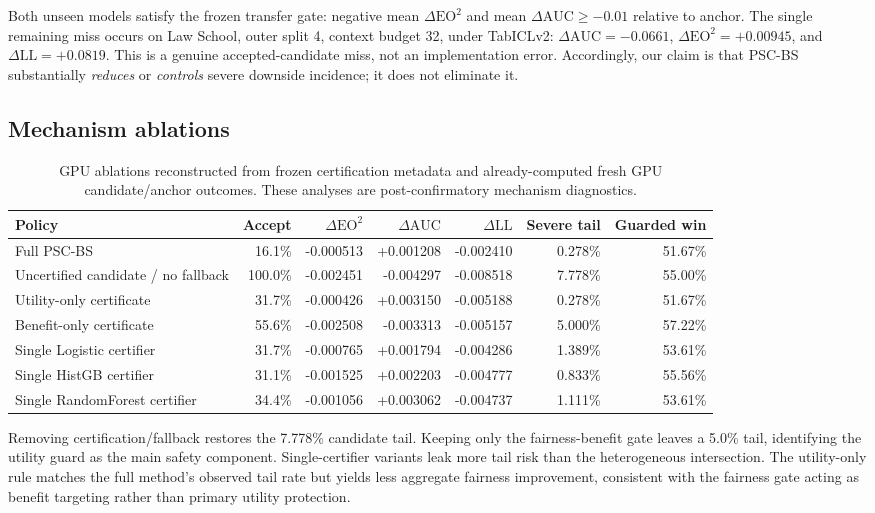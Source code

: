 \documentclass[10pt]{article}
\newcommand{\PSC}{\textsc{PSC-BS}}
\newcommand{\eo}{\mathrm{EO}^2}
\newcommand{\AUC}{\mathrm{AUC}}
\newcommand{\LL}{\mathrm{LL}}
\begin{document}
Both unseen models satisfy the frozen transfer gate: negative mean $\Delta\eo$ and mean $\Delta\AUC\ge-0.01$ relative to anchor.
The single remaining miss occurs on Law School, outer split 4, context budget 32, under TabICLv2: $\Delta\AUC=-0.0661$, $\Delta\eo=+0.00945$, and $\Delta\LL=+0.0819$.
This is a genuine accepted-candidate miss, not an implementation error.
Accordingly, our claim is that \PSC{} substantially \emph{reduces} or \emph{controls} severe downside incidence; it does not eliminate it.

\subsection{Mechanism ablations}

\begin{table}[t]
\centering
\caption{GPU ablations reconstructed from frozen certification metadata and already-computed fresh GPU candidate/anchor outcomes. These analyses are post-confirmatory mechanism diagnostics.}
\label{tab:ablation}
\small
\begin{tabular}{lrrrrrr}
\toprule
Policy & Accept & $\Delta\eo$ & $\Delta\AUC$ & $\Delta\LL$ & Severe tail & Guarded win \\
\midrule
Full \PSC{} & 16.1\% & -0.000513 & +0.001208 & -0.002410 & 0.278\% & 51.67\% \\
Uncertified candidate / no fallback & 100.0\% & -0.002451 & -0.004297 & -0.008518 & 7.778\% & 55.00\% \\
Utility-only certificate & 31.7\% & -0.000426 & +0.003150 & -0.005188 & 0.278\% & 51.67\% \\
Benefit-only certificate & 55.6\% & -0.002508 & -0.003313 & -0.005157 & 5.000\% & 57.22\% \\
Single Logistic certifier & 31.7\% & -0.000765 & +0.001794 & -0.004286 & 1.389\% & 53.61\% \\
Single HistGB certifier & 31.1\% & -0.001525 & +0.002203 & -0.004777 & 0.833\% & 55.56\% \\
Single RandomForest certifier & 34.4\% & -0.001056 & +0.003062 & -0.004737 & 1.111\% & 53.61\% \\
\bottomrule
\end{tabular}
\end{table}

Removing certification/fallback restores the 7.778\% candidate tail.
Keeping only the fairness-benefit gate leaves a 5.0\% tail, identifying the utility guard as the main safety component.
Single-certifier variants leak more tail risk than the heterogeneous intersection.
The utility-only rule matches the full method's observed tail rate but yields less aggregate fairness improvement, consistent with the fairness gate acting as benefit targeting rather than primary utility protection.
\end{document}
